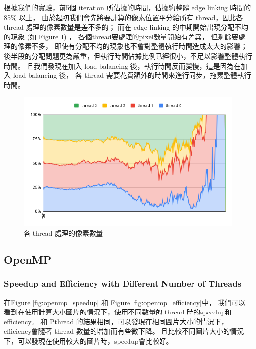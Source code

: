 \documentclass[sigconf,nonacm]{acmart}
\begin{document}
根據我們的實驗，前5個 iteration 所佔據的時間，佔據約整體 edge linking 時間的 85\% 以上，
由於起初我們會先將要計算的像素位置平分給所有 thread，因此各 thread 處理的像素數量是差不多的；
而在 edge linking 的中期開始出現分配不均的現象 (如 Figure \ref{fig:pthread_load}) ，
各個thread要處理的pixel數量開始有差異，
但剩餘要處理的像素不多，
即使有分配不均的現象也不會對整體執行時間造成太大的影響；
後半段的分配問題更為嚴重，但執行時間佔據比例已經很小，不足以影響整體執行時間。
且我們發現在加入 load balancing 後，執行時間反而變慢，這是因為在加入 load balancing 後，
各 thread 需要花費額外的時間來進行同步，拖累整體執行時間。

\begin{figure}
  \centering
  \includegraphics[width=\linewidth]{"./image/pthread_load.png"}
  \caption{各 thread 處理的像素數量}
  \label{fig:pthread_load}
\end{figure}

\subsection{OpenMP}

\subsubsection{Speedup and Efficiency with Different Number of Threads}

在Figure \ref{fig:openmp_speedup} 和 Figure \ref{fig:openmp_efficiency}中，
我們可以看到在使用計算大小圖片的情況下，使用不同數量的 thread 時的speedup和 efficiency。
和 Pthread 的結果相同，可以發現在相同圖片大小的情況下， efficiency會隨著 thread 數量的增加而有些微下降。
且比較不同圖片大小的情況下，可以發現在使用較大的圖片時，speedup會比較好。
\end{document}
